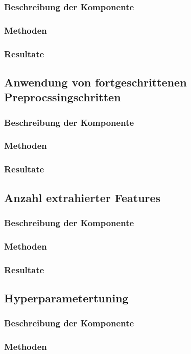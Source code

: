 \subsubsection{Beschreibung der Komponente}
\subsubsection{Methoden}
\subsubsection{Resultate}
\subsection{Anwendung von fortgeschrittenen Preprocssingschritten}
\subsubsection{Beschreibung der Komponente}
\subsubsection{Methoden}
\subsubsection{Resultate}
\subsection{Anzahl extrahierter Features}
\subsubsection{Beschreibung der Komponente}
\subsubsection{Methoden}
\subsubsection{Resultate}
\subsection{Hyperparametertuning}
\subsubsection{Beschreibung der Komponente}
\subsubsection{Methoden}
